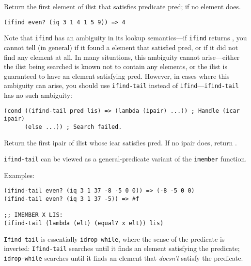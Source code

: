 \begin{entry}{%
  }

  Return the
  first element of ilist that satisfies predicate pred; \schfalse{} if no
  element does.

\begin{verbatim}
(ifind even? (iq 3 1 4 1 5 9)) => 4
\end{verbatim}

  Note that \texttt{ifind} has an ambiguity in its lookup
  semantics---if \texttt{ifind} returns \schfalse{}, you cannot tell
  (in 
  general) if it found a \schfalse{} element that satisfied pred, or
  if it did not find any element at all. In many situations, this
  ambiguity cannot arise---either the ilist being searched is known
  not to contain any \schfalse{} elements, or the ilist is guaranteed
  to have an element satisfying pred.  However, in cases where this
  ambiguity can arise, you should use \texttt{ifind-tail} instead of
  \texttt{ifind}---\texttt{ifind-tail} has no such ambiguity:

\begin{verbatim}
(cond ((ifind-tail pred lis) => (lambda (ipair) ...)) ; Handle (icar ipair)
      (else ...)) ; Search failed.
\end{verbatim}
\end{entry}

\begin{entry}{%
  }

  Return the first ipair of ilist whose icar satisfies pred. If no
  ipair does, return \schfalse{}.

  \texttt{ifind-tail} can be viewed as a general-predicate variant of
  the \texttt{imember} function.

  Examples:

\begin{verbatim}
(ifind-tail even? (iq 3 1 37 -8 -5 0 0)) => (-8 -5 0 0)
(ifind-tail even? (iq 3 1 37 -5)) => #f

;; IMEMBER X LIS:
(ifind-tail (lambda (elt) (equal? x elt)) lis)
\end{verbatim}

  \texttt{Ifind-tail} is essentially \texttt{idrop-while}, where the
  sense of the predicate is inverted: \texttt{Ifind-tail} searches
  until it finds an element satisfying the predicate;
  \texttt{idrop-while} searches until it finds an element that
  \emph{doesn't} satisfy the predicate.
\end{entry}

